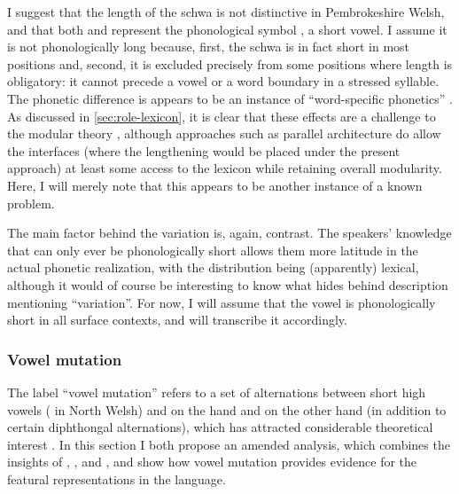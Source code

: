 I suggest that the length of the schwa is not distinctive in Pembrokeshire Welsh, and that both  and  represent the phonological symbol \ipa{[ə]}, \ie a short vowel. I assume it is not phonologically long because, first, the schwa is in fact short in most positions and, second, it is excluded precisely from some positions where length is obligatory: it cannot precede a vowel or a word boundary in a stressed syllable. The phonetic difference is appears to be an instance of \enquote{word\hyp specific phonetics} \citep{pierrehumbert02:_word}. As discussed in \cref{sec:role-lexicon}, it is clear that these effects are a challenge to the modular theory \citep{bermudez-otero10:_curren_englis}, although approaches such as  parallel architecture do allow the interfaces (where the lengthening would be placed under the present approach) at least some access to the lexicon while retaining overall modularity. Here, I will merely note that this appears to be another instance of a known problem.

The main factor behind the variation is, again, contrast. The speakers' knowledge that \ipa{[ə]} can only ever be phonologically short allows them more latitude in the actual phonetic realization, with the distribution being (apparently) lexical, although it would of course be interesting to know what hides behind  description mentioning \enquote{variation}. For now, I will assume that the vowel \ipa{[ə]} is phonologically short in all surface contexts, and will transcribe it accordingly.

\subsubsection{Vowel mutation}
\label{sec:vowel-mutation}

The label \enquote{vowel mutation} refers to a set of alternations between short high vowels \ipa{[i(ː)]} (\ipa{[ɨ(ː)]} in North Welsh) and \ipa{[u(ː)]} on the hand and \ipa{[ə]} on the other hand (in addition to certain diphthongal alternations), which has attracted considerable theoretical interest \citep{allen75:_vowel_mutat_word_stres_welsh,cartmill76:_welsh_vowel_mutat,thomas84:_north_welsh,awbery86:_pembr_welsh,bosch96:_promin,greenbook,hannahs07:_const_welsh}. In this section I both propose an amended analysis, which combines the insights of \citet{bosch96:_promin}, \citet{greenbook}, and \citet{hannahs07:_const_welsh}, and show how vowel mutation provides evidence for the featural representations in the language.

